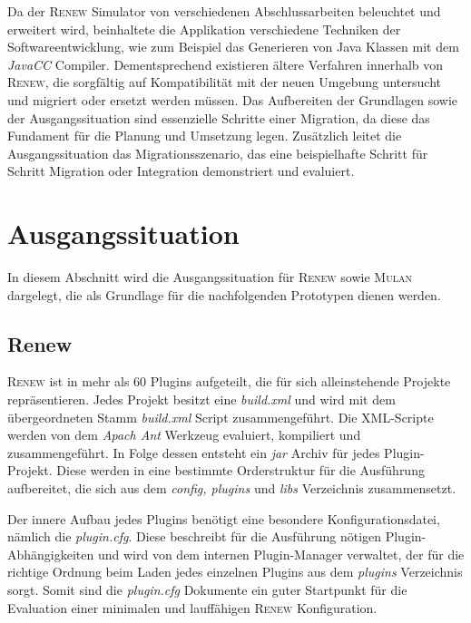 	Da der \textsc{Renew} Simulator von verschiedenen Abschlussarbeiten beleuchtet und erweitert wird, beinhaltete die Applikation verschiedene Techniken der Softwareentwicklung, wie zum Beispiel das Generieren von Java Klassen mit dem \textit{JavaCC} Compiler. Dementsprechend existieren ältere Verfahren innerhalb von \textsc{Renew}, die sorgfältig auf Kompatibilität mit der neuen Umgebung untersucht und migriert oder ersetzt werden müssen. \bigbreak
	Das Aufbereiten der Grundlagen sowie der Ausgangssituation sind essenzielle Schritte einer Migration, da diese das Fundament für die Planung und Umsetzung legen. Zusätzlich leitet die Ausgangssituation das Migrationsszenario, das eine beispielhafte Schritt für Schritt Migration oder Integration demonstriert und evaluiert.\bigbreak

\section{Ausgangssituation} \label{sec:ausgangssituation} 
	In diesem Abschnitt wird die Ausgangssituation für \textsc{Renew} sowie \textsc{Mulan} dargelegt, die als Grundlage für die nachfolgenden Prototypen dienen werden. 

	\subsection{Renew} \label{sub:renew}
		\textsc{Renew} ist in mehr als 60 Plugins aufgeteilt, die für sich alleinstehende Projekte repräsentieren. Jedes Projekt besitzt eine \textit{build.xml} und wird mit dem übergeordneten Stamm \textit{build.xml} Script zusammengeführt. Die XML-Scripte werden von dem \textit{Apach Ant} Werkzeug evaluiert, kompiliert und zusammengeführt. In Folge dessen entsteht ein \textit{jar} Archiv für jedes Plugin-Projekt. Diese werden in eine bestimmte Orderstruktur für die Ausführung aufbereitet, die sich aus dem \textit{config, plugins} und \textit{libs} Verzeichnis zusammensetzt. \bigbreak

		Der innere Aufbau jedes Plugins benötigt eine besondere Konfigurationsdatei, nämlich die \textit{plugin.cfg}. Diese beschreibt für die Ausführung nötigen Plugin-Abhängigkeiten und wird von dem internen Plugin-Manager verwaltet, der für die richtige Ordnung beim Laden jedes einzelnen Plugins aus dem \textit{plugins} Verzeichnis sorgt. Somit sind die \textit{plugin.cfg} Dokumente ein guter Startpunkt für die Evaluation einer minimalen und lauffähigen \textsc{Renew} Konfiguration. \bigbreak

